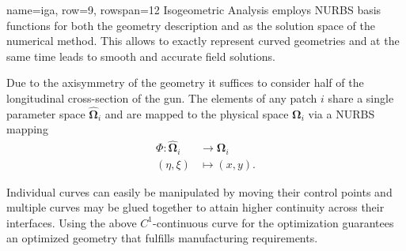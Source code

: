 \documentclass[
   accentcolor=9b,
   boxstyle=boxed
   ]{tudasciposter}
\begin{document}
\begin{tcbposter}[poster={columns=2, rows=20, spacing=1cm}]
\begin{posterboxenv}[title=Isogeometric Analysis]{name=iga, row=9, rowspan=12}
   Isogeometric Analysis employs NURBS basis functions for both the geometry description and as the solution space of the numerical method. This allows to exactly represent curved geometries and at the same time leads to smooth and accurate field solutions.\\

   \begin{center}
      
      \hfill
      
   \end{center}

   Due to the axisymmetry of the geometry it suffices to consider half of the longitudinal cross-section of the gun.
   The elements of any patch $i$ share a single parameter space $\boldsymbol{\hat{\Omega}}_i$ and are mapped to the physical space $\boldsymbol{\Omega}_i$ via a NURBS mapping
   \begin{align*}
      \Phi\colon \boldsymbol{\hat{\Omega}}_i &\to \boldsymbol{\Omega}_i\\
      (\eta, \xi) &\mapsto (x, y).
   \end{align*}

   \begin{center}
      
   \end{center}

   Individual curves can easily be manipulated by moving their control points and multiple curves may be glued together to attain higher continuity across their interfaces.
   Using the above $C^1$-continuous curve for the optimization guarantees an optimized geometry that fulfills manufacturing requirements.
\end{posterboxenv}


\end{tcbposter}
\end{document}
